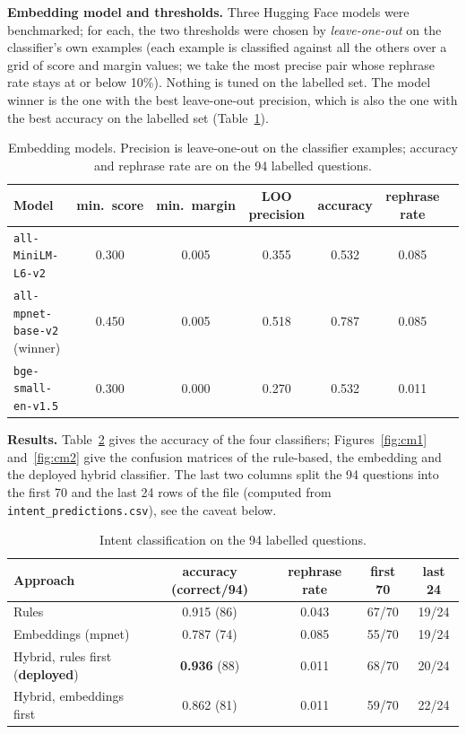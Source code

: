 \documentclass[10pt,a4paper]{article}
\newcommand{\code}[1]{\texttt{#1}}
\begin{document}
\textbf{Embedding model and thresholds.} Three Hugging Face models were benchmarked; for each, the two thresholds were chosen by \emph{leave-one-out} on the classifier's own examples (each example is classified against all the others over a grid of score and margin values; we take the most precise pair whose rephrase rate stays at or below 10\%). Nothing is tuned on the labelled set. The model winner is the one with the best leave-one-out precision, which is also the one with the best accuracy on the labelled set (Table~\ref{tab:embed}).

\begin{table}[H]
\centering\small
\caption{Embedding models. Precision is leave-one-out on the classifier examples; accuracy and rephrase rate are on the 94 labelled questions.}\label{tab:embed}
\begin{tabular}{lcccccc}
\toprule
Model & min.\ score & min.\ margin & LOO precision & accuracy & rephrase rate \\
\midrule
\code{all-MiniLM-L6-v2} & 0.300 & 0.005 & 0.355 & 0.532 & 0.085 \\
\code{all-mpnet-base-v2} (winner) & 0.450 & 0.005 & 0.518 & 0.787 & 0.085 \\
\code{bge-small-en-v1.5} & 0.300 & 0.000 & 0.270 & 0.532 & 0.011 \\
\bottomrule
\end{tabular}
\end{table}

\textbf{Results.} Table~\ref{tab:intent} gives the accuracy of the four classifiers; Figures~\ref{fig:cm1} and~\ref{fig:cm2} give the confusion matrices of the rule-based, the embedding and the deployed hybrid classifier. The last two columns split the 94 questions into the first 70 and the last 24 rows of the file (computed from \code{intent\_predictions.csv}), see the caveat below.

\begin{table}[H]
\centering\small
\caption{Intent classification on the 94 labelled questions.}\label{tab:intent}
\begin{tabular}{lcccc}
\toprule
Approach & accuracy (correct/94) & rephrase rate & first 70 & last 24 \\
\midrule
Rules & 0.915 (86) & 0.043 & 67/70 & 19/24 \\
Embeddings (mpnet) & 0.787 (74) & 0.085 & 55/70 & 19/24 \\
Hybrid, rules first (\textbf{deployed}) & \textbf{0.936} (88) & 0.011 & 68/70 & 20/24 \\
Hybrid, embeddings first & 0.862 (81) & 0.011 & 59/70 & 22/24 \\
\bottomrule
\end{tabular}
\end{table}
\end{document}
